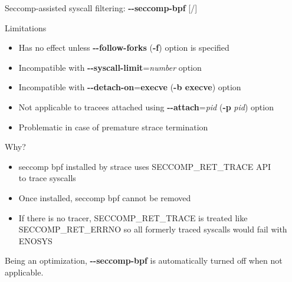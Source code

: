 \documentclass[unicode,aspectratio=169,xcolor={table,dvipsnames,usernames}]{beamer}
\begin{document}
\begin{frame}{Seccomp-assisted syscall filtering: \textbf{-{}-seccomp-bpf} \hfill [\insertframenumber/\inserttotalframenumber]}
\begin{block}{Limitations}
\begin{itemize}
	\item Has no effect unless \textbf{-{}-follow-forks} (\textbf{-f}) option is specified
	\item Incompatible with \textbf{-{}-syscall-limit}=\textit{number} option
	\item Incompatible with \textbf{-{}-detach-on}=\textbf{execve} (\textbf{-b execve}) option
	\item Not applicable to tracees attached using \textbf{-{}-attach}=\textit{pid} (\textbf{-p} \textit{pid}) option
	\item Problematic in case of premature strace termination
\end{itemize}
\end{block}

\begin{block}{Why?}
\begin{itemize}
	\item seccomp bpf installed by strace uses SECCOMP\_RET\_TRACE API \\ to trace syscalls
	\item Once installed, seccomp bpf cannot be removed
	\item If there is no tracer, SECCOMP\_RET\_TRACE is treated like SECCOMP\_RET\_ERRNO
		so all formerly traced syscalls would fail with ENOSYS
\end{itemize}
\end{block}

Being an optimization, \textbf{-{}-seccomp-bpf} is automatically turned off when not applicable.
\end{frame}
\end{document}
